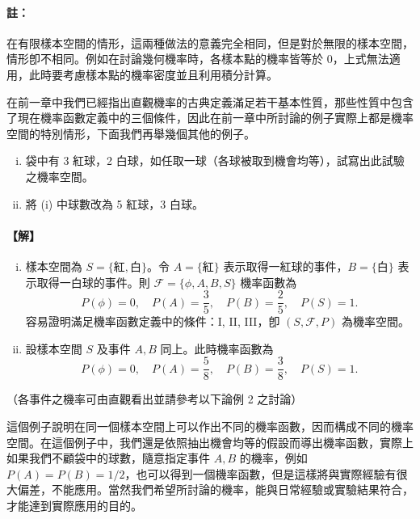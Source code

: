 \medskip
\paragraph{註：}
在有限樣本空間的情形，這兩種做法的意義完全相同，但是對於無限的樣本空間，情形卽不相同。例如在討論幾何機率時，各樣本點的機率皆等於 0，上式無法適用，此時要考慮樣本點的機率密度並且利用積分計算。

\medskip
在前一章中我們已經指出直觀機率的古典定義滿足若干基本性質，那些性質中包含了現在機率函數定義中的三個條件，因此在前一章中所討論的例子實際上都是機率空間的特別情形，下面我們再舉幾個其他的例子。

\medskip
\begin{discussion}\label{disc:b5s-4-1}
\begin{enumerate}[(i), leftmargin=2em, itemsep=0.3em]
  \item 袋中有 3 紅球，2 白球，如任取一球（各球被取到機會均等），試寫出此試驗之機率空間。
  \item 將 (i) 中球數改為 5 紅球，3 白球。
\end{enumerate}
\end{discussion}
\paragraph{【解】}
\begin{enumerate}[(i), leftmargin=2em, itemsep=0.3em]
  \item 樣本空間為 $S = \{\text{紅}, \text{白}\}$。令 $A = \{\text{紅}\}$ 表示取得一紅球的事件，$B = \{\text{白}\}$ 表示取得一白球的事件。則 $\mathscr{F} = \{\phi, A, B, S\}$ 機率函數為
  \[
  P(\phi) = 0,\quad P(A) = \frac{3}{5},\quad P(B) = \frac{2}{5},\quad P(S) = 1.
  \]
  容易證明滿足機率函數定義中的條件：I, II, III，卽 $(S, \mathscr{F}, P)$ 為機率空間。

  \item 設樣本空間 $S$ 及事件 $A, B$ 同上。此時機率函數為
  \[
  P(\phi) = 0,\quad P(A) = \frac{5}{8},\quad P(B) = \frac{3}{8},\quad P(S) = 1.
  \]
\end{enumerate}
（各事件之機率可由直觀看出並請參考以下論例 2 之討論）

這個例子說明在同一個樣本空間上可以作出不同的機率函數，因而構成不同的機率空間。在這個例子中，我們還是依照抽出機會均等的假設而導出機率函數，實際上如果我們不顧袋中的球數，隨意指定事件 $A, B$ 的機率，例如 $P(A) = P(B) = 1/2$，也可以得到一個機率函數，但是這樣將與實際經驗有很大偏差，不能應用。當然我們希望所討論的機率，能與日常經驗或實驗結果符合，才能達到實際應用的目的。

